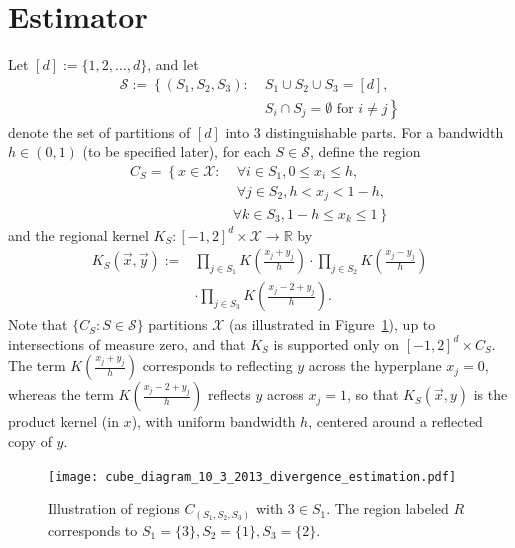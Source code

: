 \documentclass{article}
\newcommand{\R}{\mathbb{R}}                         %
\newcommand{\Se}{\mathcal{S}}                       %
\newcommand{\X}{\mathcal{X}}                        %
\newcommand{\vx}{\vec{x}}                           %
\newcommand{\vy}{\vec{y}}                           %
\begin{document}
\section{Estimator} \label{sec:estimator}
Let $[d] := \{1,2,\ldots,d\}$, and let
\begin{align*}
\Se := \left\{ (S_1,S_2,S_3) \right. : \; & S_1 \cup S_2 \cup S_3 = [d], \\
& \left. S_i \cap S_j = \emptyset \mbox{ for } i \neq j \right\}
\end{align*}
denote the set of partitions of $[d]$ into $3$ distinguishable parts. For a
bandwidth $h \in (0,1)$ (to be specified later), for each $S \in \Se$, define
the region
\begin{align*}
C_S = \left\{x \in \X : \right.
      &   \;\forall i \in S_1, 0 \leq x_i \leq h, \\
      &   \;\forall j \in S_2, h < x_j < 1 - h,   \\
      &   \left. \forall k \in S_3, 1 - h \leq x_k \leq 1 \right\}
\end{align*}
and the regional kernel $K_S : [-1,2]^d \times \X \to \R$ by
\begin{align*}
K_S(\vx,\vy) :=
 &          \prod_{j \in S_1} K \left(\frac{x_j + y_j}{h}\right)
    \cdot   \prod_{j \in S_2} K \left(\frac{x_j - y_j}{h}\right)  \\
 &  \cdot   \prod_{j \in S_3} K \left(\frac{x_j - 2 + y_j}{h}\right).
\end{align*}
Note that $\{C_S : S \in \Se\}$ partitions $\X$ (as illustrated in
Figure~\ref{fig:cube}), up to intersections of measure zero, and that $K_S$ is
supported only on $[-1,2]^d \times C_S$. The term
$K \left( \frac{x_j + y_j}{h} \right)$ corresponds to reflecting $y$ across the
hyperplane $x_j = 0$, whereas the term $K \left(\frac{x_j - 2 + y_j}{h}\right)$
reflects $y$ across $x_j = 1$, so that $K_S(\vx,y)$ is the product kernel (in
$x$), with uniform bandwidth $h$, centered around a reflected copy of $y$.
\begin{figure}[h!]
\begin{center}
\texttt{[image: cube\_diagram\_10\_3\_2013\_divergence\_estimation.pdf]}
\end{center}
\vspace{-3mm}
\caption{Illustration of regions $C_{(S_1,S_2,S_3)}$ with $3 \in S_1$. The
region labeled $R$ corresponds to $S_1 = \{3\},S_2 = \{1\},S_3 = \{2\}$.}
\label{fig:cube}
\end{figure}
\end{document}
